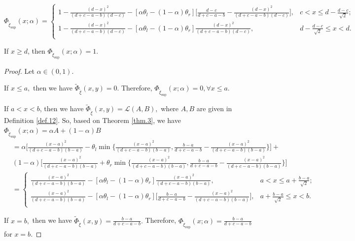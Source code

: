 \begin{theorem}
\begin{description}
		\[\Phi_{\tilde{\xi}_{\sup}}(x;\alpha)=\left\{
		\begin{array}{ll}
			1-\frac{(d-x)^2}{(d+c-a-b)(d-c)}-[\alpha\theta_l-(1-\alpha)\theta_r]\big[\frac{d-c}{d+c-a-b}-\frac{(d-x)^2}{(d+c-a-b)(d-c)}\big], & c<x\leq d-\frac{d-c}{\sqrt{2}};\\
			1-\frac{(d-x)^2}{(d+c-a-b)(d-c)}-[\alpha\theta_l-(1-\alpha)\theta_r]\frac{(d-x)^2}{(d+c-a-b)(d-c)}, & d-\frac{d-c}{\sqrt{2}}\leq x<d.\\
		\end{array}
		\right.
		\]
		\item[ VII.] If $x\geq d$, then $\Phi_{\tilde{\xi}_{\sup}}(x;\alpha)=1.$  
	\end{description}
\end{theorem}
\begin{proof}
	Let $\alpha\in (0,1)$.
	 \par If $x\leq a,$ then we have $\tilde{\Phi}_{\tilde{\xi}}(x,y)=0.$ Therefore, $\Phi_{\tilde{\xi}_{\sup}}(x;\alpha)=0, \forall x\leq a.$
	\par If $a< x< b$, then we have $\tilde{\Phi}_{\tilde{\xi}}(x,y)=\mathcal{L}(A,B),$ where $A,B$ are given in Definition \ref{def.12}. So, based on Theorem \ref{thm.3}, we have $\Phi_{\tilde{\xi}_{\sup}}(x;\alpha)=\alpha A+(1-\alpha)B$
	\begin{equation*} 
		\begin{aligned}
			&=\alpha \bigg[\frac{(x-a)^2}{(d+c-a-b)(b-a)}-\theta_l\min\bigg\{\frac{(x-a)^2}{(d+c-a-b)(b-a)},\frac{b-a}{d+c-a-b}-\frac{(x-a)^2}{(d+c-a-b)(b-a)}\bigg\}\bigg]+\\
			&(1-\alpha)\bigg[\frac{(x-a)^2}{(d+c-a-b)(b-a)}+\theta_r\min\bigg\{\frac{(x-a)^2}{(d+c-a-b)(b-a)},\frac{b-a}{d+c-a-b}-\frac{(x-a)^2}{(d+c-a-b)(b-a)}\bigg\}\bigg]\\
			& =\left\{
			\begin{array}{ll}
				\frac{(x-a)^2}{(d+c-a-b)(b-a)}-[\alpha\theta_l-(1-\alpha)\theta_r]\frac{(x-a)^2}{(d+c-a-b)(b-a)}, & a<x\leq a+\frac{b-a}{\sqrt{2}};\\
				\frac{(x-a)^2}{(d+c-a-b)(b-a)}-[\alpha\theta_l-(1-\alpha)\theta_r]\big[\frac{b-a}{d+c-a-b}-\frac{(x-a)^2}{(d+c-a-b)(b-a)}\big], & a+\frac{b-a}{\sqrt{2}}\leq x<b.\\
			\end{array}
			\right.
		\end{aligned}
	\end{equation*}
	\par If $x=b,$ then we have $\tilde{\Phi}_{\tilde{\xi}}(x,y)=\frac{b-a}{d+c-a-b}.$ Therefore, $\Phi_{\tilde{\xi}_{\sup}}(x;\alpha)=\frac{b-a}{d+c-a-b}$ for $x=b.$

\end{proof}
